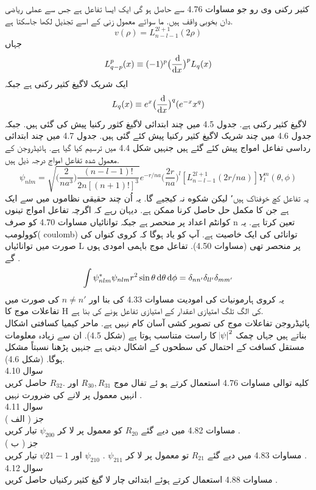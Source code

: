 \documentclass{book}
\begin{document}
كثير رکنی وی رو جو مساوات 4.76 سے حاصل ہو گی ایک ایسا تفاعل ہے جس سے عملی ریاضی دان بخوبی واقف ہیں. ما سوائے معمول زنی کے اسے تجذيل لکھا جاسکتا ہے.
 \[v(\rho)=L_{n-l-1}^{2l+1}(2\rho)\]
 جہاں
  \[L_{q-p}^{p}(x)\equiv(-1)^{p}\big(\frac{\dif}{\dif{x}}\big)^{p}L_{q}(x)\] 
 ایک شریک لاگیغ  كثير رکنی ہے جبکہ 
\[ L_{q}(x)\equiv e^{x}\big(\frac{\dif}{\dif{x}}\big)^{q}(e^{-x}x^{q})\]
 لاگیغ كثير رکنی ہے. جدول 4.5 میں چند ابتدائی لاگيغ كثور رکنیا پیش کی گئی ہیں.  جبکہ جدول 4.6 میں چند شریک لاگيغ كثير رکنیا پیش کئے گئی ہیں. جدول 4.7 میں چند ابتدائی رداسی تفاعل امواج پیش کئے گئے ہیں جنہیں شکل 4.4 میں ترسیم کیا گیا ہے. ہائیڈروجن کے معمول شده تفاعل امواج درجہ ذیل ہیں.
  \[\boxed{\psi_{nlm}=\sqrt{\big(\frac{2}{na^{3}}\big)\frac{(n-l-1)!}{2n[(n+1)!]^{3}}}e^{-r/na}\big(\frac{2r}{na}\big)^{l}[L_{n-l-1}^{2l+1}(2r/na)]Y_{l}^{m}(\theta,\phi)}\]
یہ تفاعل کچ خوفناک ہیں٬ ليكن شكوه نہ کیجیے گا. یہ اُن چند حقیقی نظاموں میں سے ایک ہے جن کا مکمل حل حاصل کرنا ممکن ہے.  دیہان رہے کہ اگرچہ تفاعل امواج تینوں کوانٹم اعداد پر منحصر ہے جبکہ توانائیاں مساوات 4.70 کو صرف n تعین کرتا ہے. یہ کوولومب( coulomb) توانائی کی ایک خاصیت ہے. آپ کو یاد ہوگا کہ کروی كنواں کی صورت میں توانائیاں L پر منحصر تھی (مساوات 4.50).
تفاعل موج باہمی امودی ہوں گے 
.\[\int\psi_{nlm}^{*}\psi_{nlm}r^{2}\sin{\theta}\dif{\theta}\dif{\phi}=\delta_{nn'}\delta_{ll'}\delta_{mm'}\]
 یہ کروی ہارمونیات کی امودیت مساوات 4.33 کی بنا اور
\(n\neq n'\)
کی صورت میں تفاعلات موج کا H کی الگ تلگ امتیازی اعقدار کے امتیازی تفاعل ہونے کی بنا ہے. \\
پائیڈروجن تفاعلات موج کی تصویر کشی آسان کام نہیں ہے. ماحر کیمیا کسافتی اشکال بناتے ہیں جہاں چمک
\(\abs{\psi}^{2}\)
کا راست متناسب ہوتا ہے (شکل 4.5). ان سے زیادہ معلومات مستقل كسافت کے احتمال کی سطحوں کے اشکال دیتی ہے جنہیں پڑھنا نسبتاً مشکل ہوگا. (شکل 4.6).\\
سوال 
4.10\\
کلیه توالی مساوات 4.76 استعمال کرتے ہو ئے  تفال موج
\(R_{30},R_{31}\)
اور
.\(R_{32}\)
حاصل کریں . انہیں معمول پر لانے کی ضرورت نہیں \\
سوال 
4.11\\
جز ( الف )\\
مساوات 4.82 میں دیے گئے
\(R_{20}\)
کو معمول پر لا کر
\(\psi_{200}\)
تیار کریں .\\
جز ( ب )\\
مساوات 4.83 میں دیے گئے
\(R_{21}\)
تو معمول پر لا کر
\(\psi_{211}\)
.
\(\psi_{210}\)
اور
\(\psi{21-1}\)
تیار کریں .\\
سوال 
4.12\\
مساوات 4.88 استعمال کرتے ہوئے ابتدائی چار لا گیغ کثیر رکنیاں حاصل کریں .\\
\end{document}
